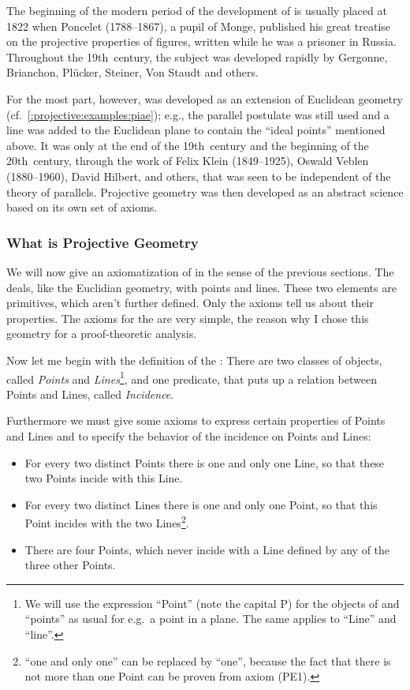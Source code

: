 The beginning of the modern period of the development of \pg is
usually placed at 1822 when Poncelet (1788--1867), a pupil of Monge,
published his great treatise on the projective properties of figures,
written while he was a prisoner in Russia. Throughout the 19th~century,
the subject was developed rapidly by Gergonne, Brianchon, Pl\"ucker,
Steiner, Von Staudt and others.

For the most part, however, \pg was developed as an extension of
Euclidean geometry (cf.~\ref{:projective:examples:piae}); e.g., the
parallel postulate was still used and a line was added to the
Euclidean plane to contain the ``ideal points'' mentioned above. It
was only at the end of the 19th~century and the beginning of the
20th~century, through the work of Felix Klein (1849--1925), Oswald
Veblen (1880--1960), David Hilbert, and others, that \pg was seen to be
independent of the theory of parallels. Projective geometry was then
developed as an abstract science based on its own set of axioms.

%
\subsubsection{What is Projective Geometry\label{:projective:definition}}
We will now give an axiomatization of \pg in the sense of the previous
sections.
The \pg deals, like the Euclidian geometry, with points and
lines. These two elements are primitives, which aren't further
defined. Only the axioms tell us about their properties. The
axioms for the \pg are very simple, the reason why I chose this
geometry for a proof-theoretic analysis. 

Now let me begin with the definition of the \pg: There are two classes
of objects, 
called {\em Points\/} and {\em Lines}\footnote{We will use the
expression ``Point'' (note the capital P) for the objects of \pg and
``points'' as usual for e.g.\ a point in a plane. The same applies to
``Line'' and ``line''.}, and one
predicate, that puts up a
relation between Points and Lines, called {\em Incidence}.

Furthermore we must give some axioms to express
certain properties of Points and Lines and to specify the behavior of
the incidence on Points and Lines:
\begin{itemize}
\item \pei For every two distinct Points there is one and only
one Line, so that these two Points incide with this Line.
\item \peii For every two distinct Lines there is one and only
one Point, so that this Point incides with the two
Lines\footnote{``one and only one'' can be replaced by ``one'',
because the fact that there is not more than one Point can be proven from
axiom (PE1).}.
\item \peiii There are four Points, which never incide with a
Line defined by any of the three other Points.
\end{itemize}

